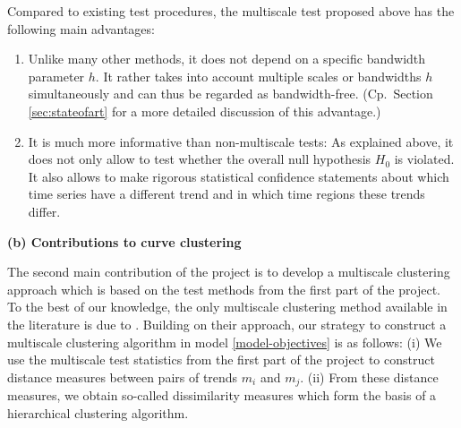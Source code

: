 \documentclass[a4paper,12pt]{article}
\begin{document}
Compared to existing test procedures, the multiscale test proposed above has the following main advantages: 
\begin{enumerate}[label=(\roman*),leftmargin=0.75cm]
\item Unlike many other methods, it does not depend on a specific bandwidth para\-meter $h$. It rather takes into account multiple scales or bandwidths $h$ simultaneously and can thus be regarded as bandwidth-free. (Cp.\ Section \ref{sec:stateofart} for a more detailed discussion of this advantage.)
\item It is much more informative than non-multiscale tests: As explained above, it does not only allow to test whether the overall null hypothesis $H_0$ is violated. It also allows to make rigorous statistical confidence statements about which time series have a different trend and in which time regions these trends differ. 
\end{enumerate}
\vspace{5pt}


\noindent \textbf{(b) Contributions to curve clustering} 
\vspace{10pt} 


\noindent The second main contribution of the project is to develop a multiscale clustering approach which is based on the test methods from the first part of the project. 
To the best of our knowledge, the only multiscale clustering method available in the literature is due to \cite{VogtLinton2018}. Building on their approach, our strategy to construct a multiscale clustering algorithm in model \eqref{model-objectives} is as follows: (i) We use the multiscale test statistics from the first part of the project to construct distance measures between pairs of trends $m_i$ and $m_j$. (ii) From these distance measures, we obtain so-called dissimilarity measures which form the basis of a hierarchical clustering algorithm. 
\end{document}

